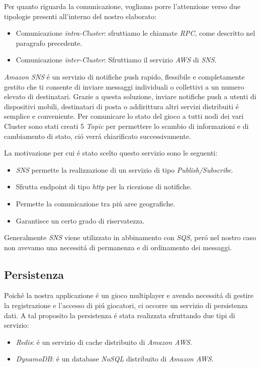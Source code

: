 \documentclass{sig-alternate-05-2015}
\begin{document}
Per quanto riguarda la comunicazione, vogliamo porre l'attenzione verso due tipologie presenti all'interno del nostro elaborato:
\begin{itemize}
\item Comunicazione \textit{intra-Cluster}: sfruttiamo le chiamate \textit{RPC}, come descritto nel paragrafo precedente.
\item Comunicazione \textit{inter-Cluster}: Sfruttiamo il servizio \textit{AWS} di \textit{SNS}.
\end{itemize}
\textit{Amazon SNS} \'e un servizio di notifiche push rapido, flessibile e completamente gestito che ti consente di inviare messaggi individuali o collettivi a un numero elevato di destinatari. Grazie a questa soluzione, inviare notifiche push a utenti di dispositivi mobili, destinatari di posta o addirittura altri servizi distribuiti \'e semplice e conveniente.
Per comunicare lo stato del gioco a tutti nodi dei vari Cluster sono stati creati 5 \textit{Topic} per permettere lo scambio di informazioni e di cambiamento di stato, ci\'o verr\'a chiarificato successivamente.

La motivazione per cui \'e stato scelto questo servizio sono le seguenti:
\begin{itemize}
\item \textit{SNS} permette la realizzazione di un servizio di tipo \textit{Publish/Subscribe}.
\item Sfrutta endpoint di tipo \textit{http} per la ricezione di notifiche.
\item Permette la comunicazione tra pi\'u aree geografiche.
\item Garantisce un certo grado di riservatezza.
\end{itemize}
Generalmente \textit{SNS} viene utilizzato in abbinamento con \textit{SQS}, per\'o nel nostro caso non avevamo una necessit\'a di permanenza e di ordinamento dei messaggi.

\subsection{Persistenza}


Poich\'e la nostra applicazione \'e un gioco multiplayer e avendo necessit\'a di gestire la registrazione e l'accesso di pi\'u giocatori, ci occorre un servizio di persistenza dati. A tal proposito la persistenza \'e stata realizzata sfruttando due tipi di servizio:
\begin{itemize}
\item \textit{Redis}: \'e un servizio di cache distribuito di \textit{Amazon AWS}.
\item \textit{DynamoDB}:  \'e un database \textit{NoSQL} distribuito di \textit{Amazon AWS}.
\end{itemize}
\end{document}

